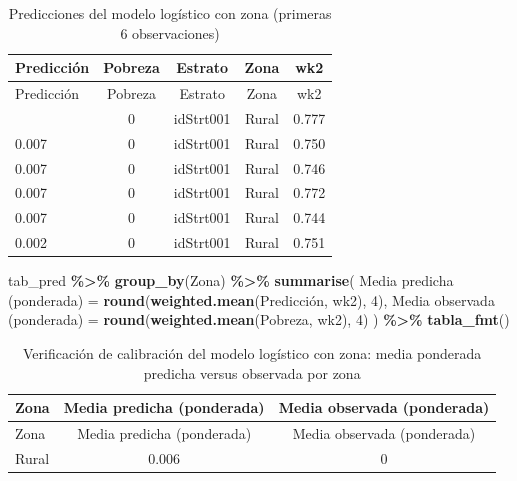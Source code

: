 \documentclass[
  spanish,
  12pt,
]{book}
\newenvironment{Shaded}{\begin{snugshade}}{\end{snugshade}}
\newcommand{\AttributeTok}[1]{\textcolor[rgb]{0.13,0.29,0.53}{#1}}
\newcommand{\DecValTok}[1]{\textcolor[rgb]{0.00,0.00,0.81}{#1}}
\newcommand{\FunctionTok}[1]{\textcolor[rgb]{0.13,0.29,0.53}{\textbf{#1}}}
\newcommand{\NormalTok}[1]{#1}
\newcommand{\OtherTok}[1]{\textcolor[rgb]{0.56,0.35,0.01}{#1}}
\newcommand{\SpecialCharTok}[1]{\textcolor[rgb]{0.81,0.36,0.00}{\textbf{#1}}}
\newcommand{\StringTok}[1]{\textcolor[rgb]{0.31,0.60,0.02}{#1}}
\begin{document}
\begin{longtable}[]{@{}lcccc@{}}
\caption{\label{tab:tab-pred-logit-zona}Predicciones del modelo logístico con zona (primeras 6 observaciones)}\tabularnewline
\toprule\noalign{}
Predicción & Pobreza & Estrato & Zona & wk2 \\
\midrule\noalign{}
\endfirsthead
\toprule\noalign{}
Predicción & Pobreza & Estrato & Zona & wk2 \\
\midrule\noalign{}
\endhead
\bottomrule\noalign{}
\endlastfoot
0.007 & 0 & idStrt001 & Rural & 0.777 \\
0.007 & 0 & idStrt001 & Rural & 0.750 \\
0.007 & 0 & idStrt001 & Rural & 0.746 \\
0.007 & 0 & idStrt001 & Rural & 0.772 \\
0.007 & 0 & idStrt001 & Rural & 0.744 \\
0.002 & 0 & idStrt001 & Rural & 0.751 \\
\end{longtable}

\begin{Shaded}
\begin{Highlighting}[]
\NormalTok{tab\_pred }\SpecialCharTok{\%\textgreater{}\%}
  \FunctionTok{group\_by}\NormalTok{(Zona) }\SpecialCharTok{\%\textgreater{}\%}
  \FunctionTok{summarise}\NormalTok{(}
    \StringTok{\textasciigrave{}}\AttributeTok{Media predicha (ponderada)}\StringTok{\textasciigrave{}}  \OtherTok{=} \FunctionTok{round}\NormalTok{(}\FunctionTok{weighted.mean}\NormalTok{(Predicción, wk2), }\DecValTok{4}\NormalTok{),}
    \StringTok{\textasciigrave{}}\AttributeTok{Media observada (ponderada)}\StringTok{\textasciigrave{}} \OtherTok{=} \FunctionTok{round}\NormalTok{(}\FunctionTok{weighted.mean}\NormalTok{(Pobreza, wk2), }\DecValTok{4}\NormalTok{)}
\NormalTok{  ) }\SpecialCharTok{\%\textgreater{}\%} \FunctionTok{tabla\_fmt}\NormalTok{()}
\end{Highlighting}
\end{Shaded}

\begin{longtable}[]{@{}lcc@{}}
\caption{\label{tab:tab-calibracion-logit-zona}Verificación de calibración del modelo logístico con zona: media ponderada predicha versus observada por zona}\tabularnewline
\toprule\noalign{}
Zona & Media predicha (ponderada) & Media observada (ponderada) \\
\midrule\noalign{}
\endfirsthead
\toprule\noalign{}
Zona & Media predicha (ponderada) & Media observada (ponderada) \\
\midrule\noalign{}
\endhead
\bottomrule\noalign{}
\endlastfoot
Rural & 0.006 & 0 \\
\end{longtable}
\end{document}
